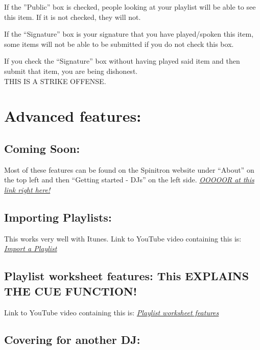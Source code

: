 \documentclass[12pt]{article}
\begin{document}
If the ''Public'' box is checked, people looking at your playlist will be able to see this item. If it is not checked, they will not.

If the ``Signature'' box is your signature that you have played/spoken this item, some items will not be able to be submitted if you do not check this box.

\hrulefill

If you check the ``Signature'' box without having played said item and then submit that item, you are being dishonest. 
\\
THIS IS A STRIKE OFFENSE.

\hrulefill








\section{Advanced features:}

\subsection{Coming Soon:}

Most of these features can be found on the Spinitron website under ``About'' on the top left and then ``Getting started - DJs'' on the left side. 
\href{https://spinitron.com/about/help/get-started-dj.html}{{\it OOOOOR at this link right here!}}

\subsection{Importing Playlists:}

This works very well with Itunes.
Link to YouTube video containing this is: 
\href{https://www.youtube.com/watch?v=aN8mCR1NiHc}{{\it Import a Playlist}}

\subsection{Playlist worksheet features: This EXPLAINS THE CUE FUNCTION!}

Link to YouTube video containing this is:
\href{https://www.youtube.com/watch?v=xj7dVbhUXFM}{{\it Playlist worksheet features}}

\subsection{Covering for another DJ:}
\end{document}
